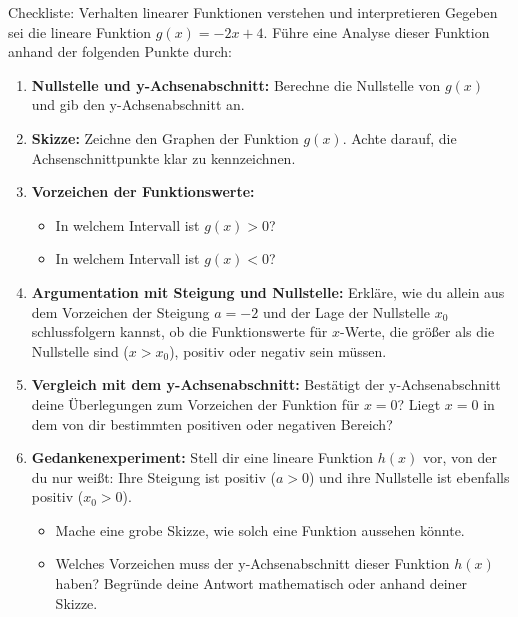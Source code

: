 \begin{aufgabenumgebung}{Checkliste: Verhalten linearer Funktionen verstehen und interpretieren}
Gegeben sei die lineare Funktion $g(x) = -2x + 4$.
Führe eine Analyse dieser Funktion anhand der folgenden Punkte durch:

\begin{enumerate}[label=(\alph*)]
    \item \textbf{Nullstelle und y-Achsenabschnitt:} Berechne die Nullstelle von $g(x)$ und gib den y-Achsenabschnitt an.
    \item \textbf{Skizze:} Zeichne den Graphen der Funktion $g(x)$. Achte darauf, die Achsenschnittpunkte klar zu kennzeichnen.
    \item \textbf{Vorzeichen der Funktionswerte:}
    \begin{itemize}
        \item In welchem Intervall ist $g(x) > 0$?
        \item In welchem Intervall ist $g(x) < 0$?
    \end{itemize}
    \item \textbf{Argumentation mit Steigung und Nullstelle:} Erkläre, wie du allein aus dem Vorzeichen der Steigung $a=-2$ und der Lage der Nullstelle $x_0$ schlussfolgern kannst, ob die Funktionswerte für $x$-Werte, die größer als die Nullstelle sind ($x > x_0$), positiv oder negativ sein müssen.
    \item \textbf{Vergleich mit dem y-Achsenabschnitt:} Bestätigt der y-Achsenabschnitt deine Überlegungen zum Vorzeichen der Funktion für $x=0$? Liegt $x=0$ in dem von dir bestimmten positiven oder negativen Bereich?
    \item \textbf{Gedankenexperiment:} Stell dir eine lineare Funktion $h(x)$ vor, von der du nur weißt: Ihre Steigung ist positiv ($a > 0$) und ihre Nullstelle ist ebenfalls positiv ($x_0 > 0$).
    \begin{itemize}
        \item Mache eine grobe Skizze, wie solch eine Funktion aussehen könnte.
        \item Welches Vorzeichen muss der y-Achsenabschnitt dieser Funktion $h(x)$ haben? Begründe deine Antwort mathematisch oder anhand deiner Skizze.
    \end{itemize}
\end{enumerate}
\end{aufgabenumgebung}